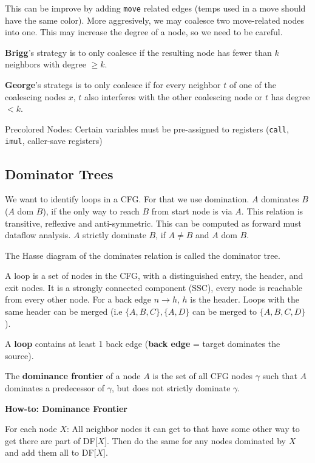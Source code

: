 This can be improve by adding \texttt{move} related edges (temps used in a move should have the same color). More aggresively, we may coalesce two move-related nodes into one. This may increase the degree of a node, so we need to be careful. \medskip

\textbf{Brigg}'s strategy is to only coalesce if the resulting node has fewer than $k$ neighbors with degree $\geq k$. \medskip

\textbf{George}'s strategs is to only coalesce if for every neighbor $t$ of one of the coalescing nodes $x$, $t$ also interferes with the other coalescing node or $t$ has degree $< k$.\medskip

Precolored Nodes: Certain variables must be pre-assigned to registers (\texttt{call}, \texttt{imul}, caller-save registers)



\subsection*{Dominator Trees}

We want to identify loops in a CFG. For that we use domination. $A$ dominates $B$ ($A$ dom $B$), if the only way to reach $B$ from start node is via $A$. This relation is transitive, reflexive and anti-symmetric. This can be computed as forward must dataflow analysis. $A$ strictly dominate $B$, if $A \neq B$ and $A$ dom $B$.\medskip

The Hasse diagram of the dominates relation is called the dominator tree.\medskip

A loop is a set of nodes in the CFG, with a distinguished entry, the header, and exit nodes.
It is a strongly connected component (SSC), every node is reachable from every other node.
For a back edge $n \rightarrow h$, $h$ is the header. Loops with the same header can be merged (i.e $\{A,B,C\}, \{A,D\}$ can be merged to $\{A,B,C,D\}$). \medskip

A \textbf{loop} contains at least 1 back edge (\textbf{back edge} = target dominates the source).\medskip

The \textbf{dominance frontier} of a node $A$ is the set of all CFG nodes
$\gamma$ such that $A$ dominates a predecessor of $\gamma$, but does not
strictly dominate $\gamma$.

\textbf{How-to: Dominance Frontier}

For each node $X$: All neighbor nodes it can get to that have some other way to get there
are part of DF[$X$]. Then do the same for any nodes dominated by $X$ and add them all
to DF[$X$].


